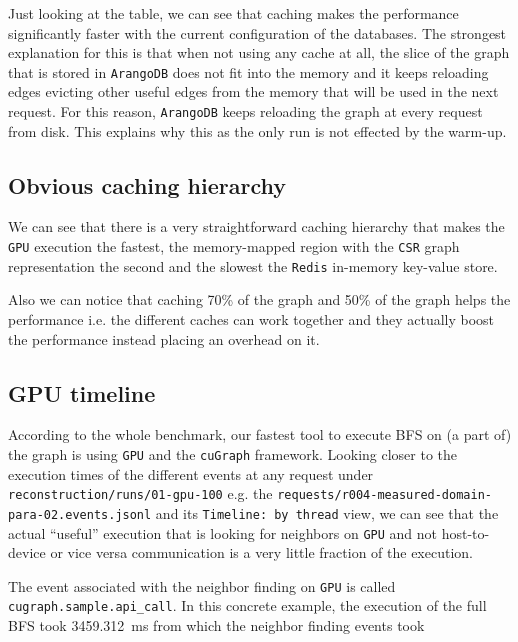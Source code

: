 \documentclass[11pt,a4paper]{article}
\begin{document}
Just looking at the table, we can see that caching makes the performance significantly faster with the current configuration of the databases. The strongest explanation for this is that when not using any cache at all, the slice of the graph that is stored in \texttt{ArangoDB} does not fit into the memory and it keeps reloading edges evicting other useful edges from the memory that will be used in the next request. For this reason, \texttt{ArangoDB} keeps reloading the graph at every request from disk. This explains why this as the only run is not effected by the warm-up.



\subsection{Obvious caching hierarchy}

We can see that there is a very straightforward caching hierarchy that makes the \texttt{GPU} execution the fastest, the memory-mapped region with the \texttt{CSR} graph representation the second and the slowest the \texttt{Redis} in-memory key-value store. 

Also we can notice that caching 70\% of the graph and 50\% of the graph helps the performance i.e. the different caches can work together and they actually boost the performance instead placing an overhead on it.

\subsection{GPU timeline}

According to the whole benchmark, our fastest tool to execute BFS on (a part of) the graph is using \texttt{GPU} and the \texttt{cuGraph} framework. Looking closer to the execution times of the different events at any request under \texttt{reconstruction/runs/01-gpu-100} e.g. the \texttt{requests/r004-measured-domain-para-02.events.jsonl} and its \texttt{Timeline: by thread} view, we can see that the actual ``useful'' execution that is looking for neighbors on \texttt{GPU} and not host-to-device or vice versa communication is a very little fraction of the execution.

The event associated with the neighbor finding on \texttt{GPU} is called \texttt{cugraph.sample.api\_call}. In this concrete example, the execution of the full BFS took \SI{3459.312}{\milli\second} from which the neighbor finding events took 
\end{document}
